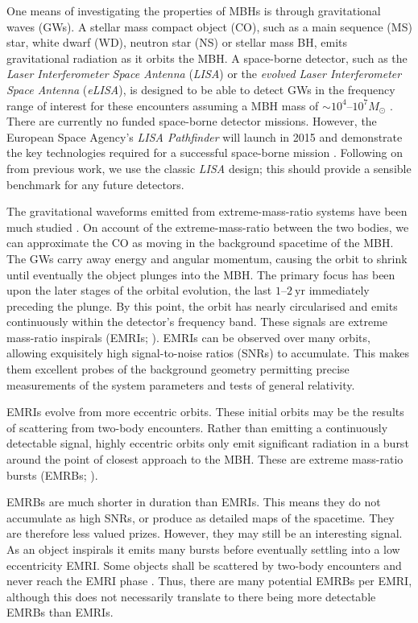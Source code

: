 \documentclass[useAMS,usedcolumn,usegraphicx,usenatbib]{mn2e}
\newcommand{\units}[1]{\ensuremath{~\mathrm{#1}}}
\begin{document}
One means of investigating the properties of MBHs is through gravitational waves (GWs). A stellar mass compact object (CO), such as a main sequence (MS) star, white dwarf (WD), neutron star (NS) or stellar mass BH, emits gravitational radiation as it orbits the MBH. A space-borne detector, such as the \textit{Laser Interferometer Space Antenna} (\textit{LISA}) or the \textit{evolved Laser Interferometer Space Antenna} (\textit{eLISA}), is designed to be able to detect GWs in the frequency range of interest for these encounters assuming a MBH mass of $\sim 10^4$--$10^7M_\odot$ \citep{Bender1998, Danzmann2003, Jennrich2011, Amaro-Seoane2012a}. There are currently no funded space-borne detector missions. However, the European Space Agency's \textit{LISA Pathfinder} will launch in 2015 and demonstrate the key technologies required for a successful space-borne mission \citep{Anza2005, Antonucci2012}. Following on from previous work, we use the classic \textit{LISA} design; this should provide a sensible benchmark for any future detectors.

The gravitational waveforms emitted from extreme-mass-ratio systems have been much studied \citep{Glampedakis2005, Barack2009}. On account of the extreme-mass-ratio between the two bodies, we can approximate the CO as moving in the background spacetime of the MBH. The GWs carry away energy and angular momentum, causing the orbit to shrink until eventually the object plunges into the MBH. The primary focus has been upon the later stages of the orbital evolution, the last $1$--$2\units{yr}$ immediately preceding the plunge. By this point, the orbit has nearly circularised and emits continuously within the detector's frequency band. These signals are extreme mass-ratio inspirals (EMRIs; \citealt{Amaro-Seoane2007}). EMRIs can be observed over many orbits, allowing exquisitely high signal-to-noise ratios (SNRs) to accumulate. This makes them excellent probes of the background geometry permitting precise measurements of the system parameters and tests of general relativity.

EMRIs evolve from more eccentric orbits. These initial orbits may be the results of scattering from two-body encounters. Rather than emitting a continuously detectable signal, highly eccentric orbits only emit significant radiation in a burst around the point of closest approach to the MBH. These are extreme mass-ratio bursts (EMRBs; \citealt*{Rubbo2006}).

EMRBs are much shorter in duration than EMRIs. This means they do not accumulate as high SNRs, or produce as detailed maps of the spacetime. They are therefore less valued prizes. However, they may still be an interesting signal. As an object inspirals it emits many bursts before eventually settling into a low eccentricity EMRI. Some objects shall be scattered by two-body encounters and never reach the EMRI phase \citep{Alexander2003}. Thus, there are many potential EMRBs per EMRI, although this does not necessarily translate to there being more detectable EMRBs than EMRIs.
\end{document}

